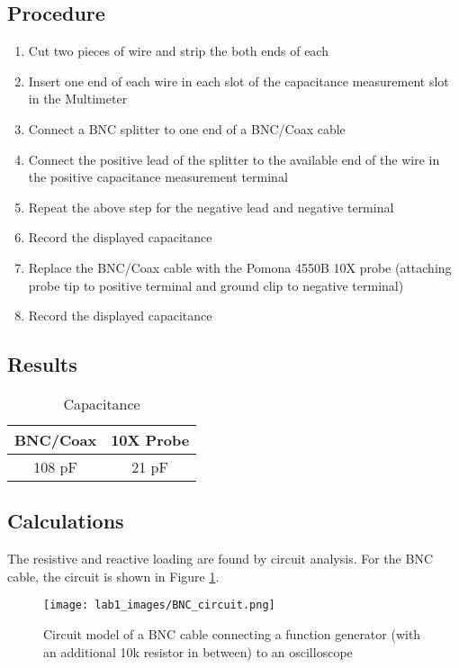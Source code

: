 \documentclass[12pt,letterpaper]{report}
\begin{document}
\subsection*{Procedure}
\begin{enumerate}
	\item Cut two pieces of wire and strip the both ends of each
	\item Insert one end of each wire in each slot of the capacitance measurement slot in the Multimeter
	\item Connect a BNC splitter to one end of a BNC/Coax cable
	\item Connect the positive lead of the splitter to the available end of the wire in the positive capacitance measurement terminal
	\item Repeat the above step for the negative lead and negative terminal
	\item Record the displayed capacitance
	\item Replace the BNC/Coax cable with the Pomona 4550B 10X probe (attaching probe tip to positive terminal and ground clip to negative terminal)
	\item Record the displayed capacitance
\end{enumerate}
\subsection*{Results}
\begin{center}
\begin{table}[ht]
\caption{Capacitance}
\centering
	\begin{tabular}{| c | c |}
	\hline
	
	\textbf{BNC/Coax} & \textbf{10X Probe} \\
	\hline
	108 pF & 21 pF \\

	\hline
	\end{tabular}
\end{table}
\end{center}

\subsection*{Calculations}
The resistive and reactive loading are found by circuit analysis. For the BNC cable, the circuit is shown in Figure \ref{fig:bnc_circuit}.

\begin{figure}
	\centering
	\texttt{[image: lab1\_images/BNC\_circuit.png]} 
	\caption{Circuit model of a BNC cable connecting a function generator (with an additional 10k resistor in between) to an oscilloscope}
	\label{fig:bnc_circuit}
\end{figure}
\end{document}
